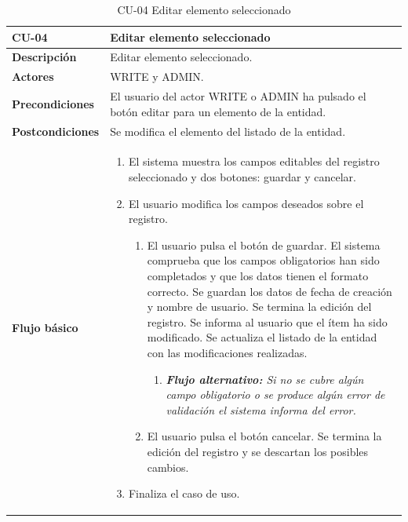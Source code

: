 \begin{table} [H]
    \centering
    \setlength{\leftmargini}{0.4cm}
	\resizebox{14cm}{!} { %
    \begin{tabular}{| m{3cm} | m{11cm} |}   
    \hline
	  \textbf{CU-04} & \textbf{Editar elemento seleccionado} \\\hline
	  \textbf{Descripción} & Editar elemento seleccionado. \\\hline
	  \textbf{Actores} & WRITE y ADMIN. \\\hline
	  \textbf{Precondiciones} & El usuario del actor WRITE o ADMIN ha pulsado el botón editar para un elemento de la entidad. \\\hline
	  \textbf{Postcondiciones} & Se modifica el elemento del listado de la entidad. \\\hline
	  \textbf{Flujo básico} & 
		\begin{enumerate}
	  	\item El sistema muestra los campos editables del registro seleccionado y dos botones: guardar y cancelar.
\item El usuario modifica los campos deseados sobre el registro. 
			\begin{enumerate}	
			   \item El usuario pulsa el botón de guardar. El sistema comprueba que los campos obligatorios han sido completados y que los datos tienen el formato correcto. Se guardan los datos de fecha de creación y nombre de usuario. Se termina la edición del registro. Se informa al usuario que el ítem ha sido modificado. Se actualiza el listado de la entidad con las modificaciones realizadas.
			   \begin{enumerate}	
			   \item  \textit{\textbf{Flujo alternativo:} Si no se cubre algún campo obligatorio o se produce algún error de validación el sistema informa del error.}
			   \end{enumerate}
			   \item El usuario pulsa el botón cancelar. Se termina la edición del registro y se descartan los posibles cambios.
			\end{enumerate}
	  \item Finaliza el caso de uso.
	  \end{enumerate} 	  	  
	  \\\hline
    \end{tabular}
    } %
    \caption{CU-04 Editar elemento seleccionado}
    \label{tab:cu-editar-elemento}
\end{table}


